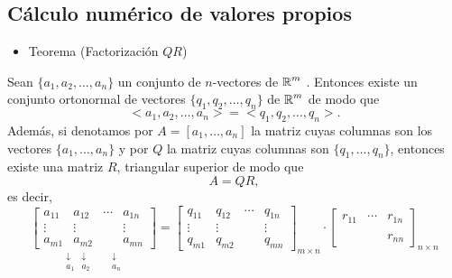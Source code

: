 \subsection{Cálculo numérico de valores propios}
\begin{itemize}[label=\color{red}\textbullet, leftmargin=*]
	\item \color{lightblue}Teorema (Factorización $QR$)
\end{itemize}
Sean $\{a_1,a_2,\dots,a_n\}$ un conjunto de $n$-vectores de $\operatorname{\mathbb{R}}^m$ . Entonces existe un conjunto ortonormal de vectores $\{q_1,q_2,\dots,q_n\}$ de $\operatorname{\mathbb{R}}^m$ de modo que \[ <a_1,a_2,\dots,a_n>=<q_1,q_2,\dots,q_n>. \]
Además, si denotamos por $A=[a_1,\dots,a_n]$ la matriz cuyas columnas son los vectores $\{a_1,\dots,a_n\}$ y por $Q$ la matriz cuyas columnas son $\{q_1,\dots,q_n\}$, entonces existe una matriz $R$, triangular superior de modo que \[ A=QR, \]es decir,\[\underset{\begin{array}{cccc}
		\downarrow & \downarrow & & \downarrow\\
		a_1 & a_2 & ~~~~ & a_n
\end{array}}{\begin{bmatrix}
		a_{11} & a_{12} & \cdots & a_{1n}\\
		\vdots & \vdots & & \vdots\\
		a_{m1} & a_{m2} & & a_{mn}
\end{bmatrix}}=\begin{bmatrix}
	q_{11} & q_{12} & \cdots & q_{1n}\\
	\vdots & \vdots & & \vdots\\
	q_{m1} & q_{m2} & & q_{mn}
\end{bmatrix}_{m\times n}\cdot\begin{bmatrix}
	r_{11} & \cdots & r_{1n}\\
	& & \\
	& & r_{nn}
\end{bmatrix}_{n\times n}  \]
\Ej\\
